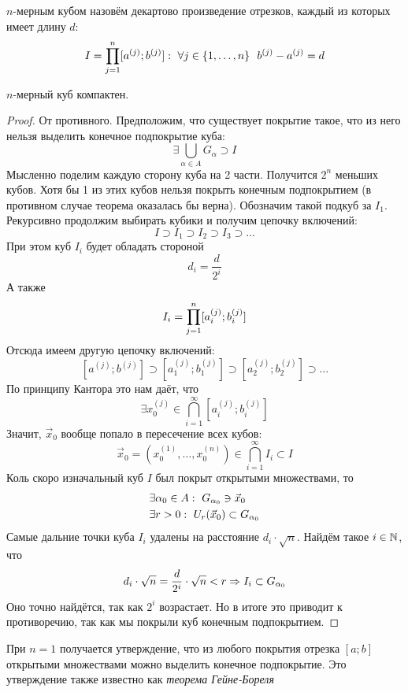 \begin{definition}
	$n$-мерным кубом назовём декартово произведение отрезков, каждый из которых имеет длину $d$:
	\[
		I = \prod\limits_{j = 1}^n [a^{(j)}; b^{(j)}] :\  \forall j \in \{1, \ldots, n\}\ \ b^{(j)} - a^{(j)} = d
	\]
\end{definition}

\begin{theorem}
	$n$-мерный куб компактен.
\end{theorem}

\begin{proof}
	От противного. Предположим, что существует покрытие такое, что из него нельзя выделить конечное подпокрытие куба:
	\[
		\exists \bigcup\limits_{\alpha \in A} G_\alpha \supset I
	\]
	Мысленно поделим каждую сторону куба на 2 части. Получится $2^n$ меньших кубов. Хотя бы 1 из этих кубов нельзя покрыть конечным подпокрытием (в противном случае теорема оказалась бы верна). Обозначим такой подкуб за $I_1$. Рекурсивно продолжим выбирать кубики и получим цепочку включений:
	\[
		I \supset I_1 \supset I_2 \supset I_3 \supset \ldots
	\]
	При этом куб $I_i$ будет обладать стороной
	\[
		d_i = \frac{d}{2^i}
	\]
	А также
	\[
		I_i = \prod\limits_{j = 1}^n [a_i^{(j)}; b_i^{(j)}]
	\]
	Отсюда имеем другую цепочку включений:
	\[
		[a^{(j)}; b^{(j)}] \supset [a_1^{(j)}; b_1^{(j)}] \supset [a_2^{(j)}; b_2^{(j)}] \supset \ldots
	\]
	По принципу Кантора это нам даёт, что
	\[
		\exists x_0^{(j)} \in \bigcap\limits_{i = 1}^\infty [a_i^{(j)}; b_i^{(j)}]
	\]
	Значит, $\vec{x}_0$ вообще попало в пересечение всех кубов:
	\[
		\vec{x}_0 = (x_0^{(1)}, \ldots, x_0^{(n)}) \in \bigcap\limits_{i = 1}^\infty I_i \subset I
	\]
	Коль скоро изначальный куб $I$ был покрыт открытыми множествами, то
	\begin{align*}
		&{\exists \alpha_0 \in A :\  G_{\alpha_0} \ni \vec{x}_0}
		\\
		&{\exists r > 0 :\  U_r(\vec{x}_0) \subset G_{\alpha_0}}
	\end{align*}
	Самые дальние точки куба $I_i$ удалены на расстояние $d_i \cdot \sqrt{n}$. Найдём такое $i \in \mathbb{N}$, что
	\[
		d_i \cdot \sqrt{n} = \frac{d}{2^i} \cdot \sqrt{n} < r \Rightarrow I_i \subset G_{\alpha_0}
	\]
	Оно точно найдётся, так как $2^i$ возрастает. Но в итоге это приводит к противоречию, так как мы покрыли куб конечным подпокрытием.
\end{proof}

\begin{corollary}
	При $n = 1$ получается утверждение, что из любого покрытия отрезка $[a; b]$ открытыми множествами можно выделить конечное подпокрытие. Это утверждение также известно как \textit{теорема Гейне-Бореля}
\end{corollary}

